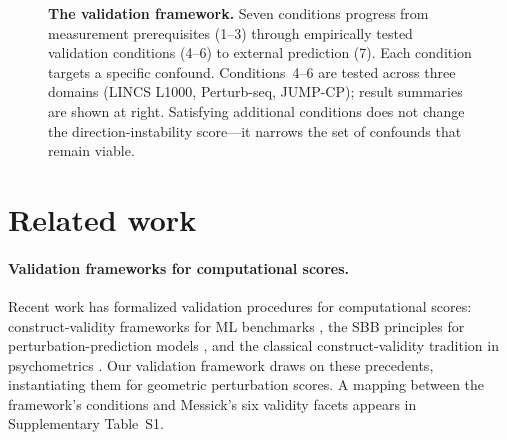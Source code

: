 \documentclass[11pt]{article}
\begin{document}
\begin{figure}[t]
\centering
{}
\caption{%
\textbf{The validation framework.}
Seven conditions progress from measurement prerequisites (1--3)
through empirically tested validation conditions (4--6) to external
prediction (7). Each condition targets a specific confound.
Conditions~4--6 are tested across three domains (LINCS L1000, Perturb-seq,
JUMP-CP); result summaries are shown at right. Satisfying additional
conditions does not change the direction-instability score---it narrows
the set of confounds that remain viable.}
\label{fig:ladder}
\end{figure}

\section{Related work}

\paragraph{Validation frameworks for computational scores.}
Recent work has formalized validation procedures for computational scores:
construct-validity frameworks for ML benchmarks
\citep{freiesleben2025benchmarking,watson2025measuring}, the SBB
principles for perturbation-prediction models \citep{sbb2026principles},
and the classical construct-validity tradition in psychometrics
\citep{cronbach1955construct,messick1995validity}. Our validation
framework draws on these precedents, instantiating them for geometric
perturbation scores. A mapping between the framework's conditions and
Messick's six validity facets appears in Supplementary Table~S1.
\end{document}
